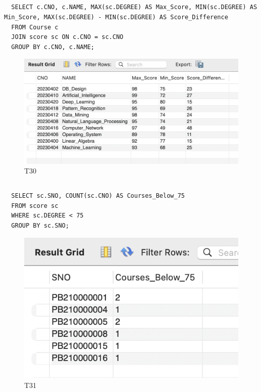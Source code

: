 \documentclass[UTF8]{ctexart}
\begin{document}
\subsection{}
\begin{lstlisting}
  SELECT c.CNO, c.NAME, MAX(sc.DEGREE) AS Max_Score, MIN(sc.DEGREE) AS Min_Score, MAX(sc.DEGREE) - MIN(sc.DEGREE) AS Score_Difference
  FROM Course c
  JOIN score sc ON c.CNO = sc.CNO
  GROUP BY c.CNO, c.NAME;  
\end{lstlisting}
\begin{figure}[H]
  \centering
  \includegraphics[scale=0.7]{pics/30.png}
  \caption*{T30}
\end{figure}

\subsection{}
\begin{lstlisting}
  SELECT sc.SNO, COUNT(sc.CNO) AS Courses_Below_75
  FROM score sc
  WHERE sc.DEGREE < 75
  GROUP BY sc.SNO;  
\end{lstlisting}
\begin{figure}[H]
  \centering
  \includegraphics[scale=0.7]{pics/31.png}
  \caption*{T31}
\end{figure}
\end{document}
